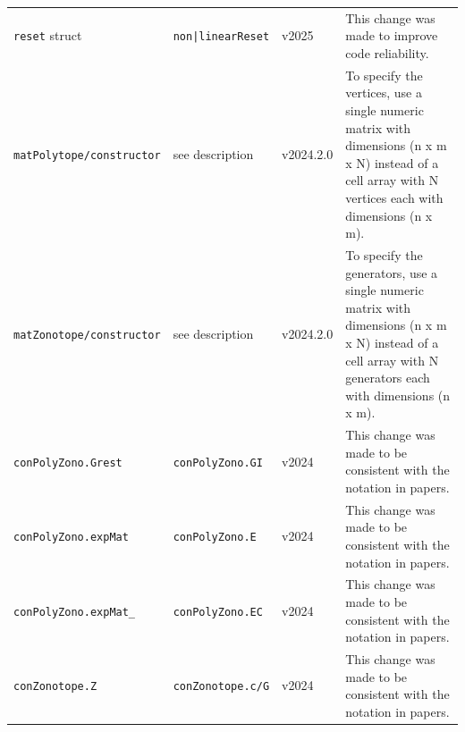\begin{table}
{\begin{tabular}{ l l l p{8cm} }
            \texttt{reset} struct            & \texttt{non|linearReset}           & v2025          & This change was made to improve code reliability.                                                                                                                                                                                                                          \\
            \texttt{matPolytope/constructor} & see description                    & v2024.2.0      & To specify the vertices, use a single numeric matrix with dimensions (n x m x N) instead of a cell array with N vertices each with dimensions (n x m).                                                                                                                     \\
            \texttt{matZonotope/constructor} & see description                    & v2024.2.0      & To specify the generators, use a single numeric matrix with dimensions (n x m x N) instead of a cell array with N generators each with dimensions (n x m).                                                                                                                 \\
            \texttt{conPolyZono.Grest}       & \texttt{conPolyZono.GI}            & v2024          & This change was made to be consistent with the notation in papers.                                                                                                                                                                                                         \\
            \texttt{conPolyZono.expMat}      & \texttt{conPolyZono.E}             & v2024          & This change was made to be consistent with the notation in papers.                                                                                                                                                                                                         \\
            \texttt{conPolyZono.expMat\_}    & \texttt{conPolyZono.EC}            & v2024          & This change was made to be consistent with the notation in papers.                                                                                                                                                                                                         \\
            \texttt{conZonotope.Z}           & \texttt{conZonotope.c/G}           & v2024          & This change was made to be consistent with the notation in papers.                                                                                                                                                                                                         \\

\end{tabular}}
\end{table}
